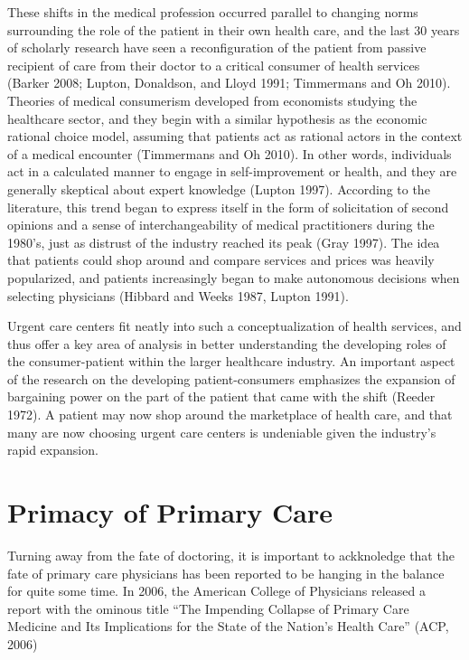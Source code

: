 \documentclass[12pt,twoside]{reedthesis}
\begin{document}
  These shifts in the medical profession occurred parallel to changing
  norms surrounding the role of the patient in their own health care, and
  the last 30 years of scholarly research have seen a reconfiguration of
  the patient from passive recipient of care from their doctor to a
  critical consumer of health services (Barker 2008; Lupton, Donaldson,
  and Lloyd 1991; Timmermans and Oh 2010). Theories of medical consumerism
  developed from economists studying the healthcare sector, and they begin
  with a similar hypothesis as the economic rational choice model,
  assuming that patients act as rational actors in the context of a
  medical encounter (Timmermans and Oh 2010). In other words, individuals
  act in a calculated manner to engage in self-improvement or health, and
  they are generally skeptical about expert knowledge (Lupton 1997).
  According to the literature, this trend began to express itself in the
  form of solicitation of second opinions and a sense of
  interchangeability of medical practitioners during the 1980's, just as
  distrust of the industry reached its peak (Gray 1997). The idea that
  patients could shop around and compare services and prices was heavily
  popularized, and patients increasingly began to make autonomous
  decisions when selecting physicians (Hibbard and Weeks 1987, Lupton
  1991).
  
  Urgent care centers fit neatly into such a conceptualization of health
  services, and thus offer a key area of analysis in better understanding
  the developing roles of the consumer-patient within the larger
  healthcare industry. An important aspect of the research on the
  developing patient-consumers emphasizes the expansion of bargaining
  power on the part of the patient that came with the shift (Reeder 1972).
  A patient may now shop around the marketplace of health care, and that
  many are now choosing urgent care centers is undeniable given the
  industry's rapid expansion.
  
  \section{Primacy of Primary Care}\label{primacy-of-primary-care}
  
  Turning away from the fate of doctoring, it is important to ackknoledge
  that the fate of primary care physicians has been reported to be hanging
  in the balance for quite some time. In 2006, the American College of
  Physicians released a report with the ominous title ``The Impending
  Collapse of Primary Care Medicine and Its Implications for the State of
  the Nation's Health Care'' (ACP, 2006)
  
\end{document}
